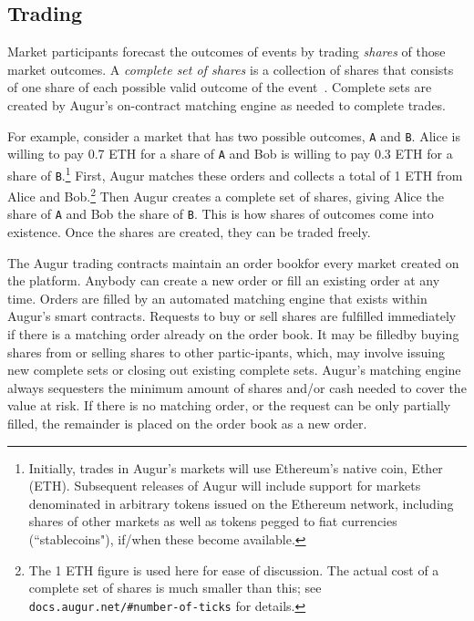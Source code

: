 \documentclass[12pt,floatfix,reprint,nofootinbib,amsmath,amssymb,epsfig,pre,floats,letterpaper,groupedaffiliation]{revtex4-1}
\theoremstyle{definition}
\theoremstyle{definition}
\begin{document}
\subsection{Trading}

Market participants forecast the outcomes of events by trading \textit{shares} of those market outcomes. A \textit{complete set of shares} is a collection of shares that consists of one share of each possible valid outcome of the event~\cite{Clark_2014}. Complete sets are created by Augur's on-contract matching engine as needed to complete trades.

For example, consider a market that has two possible outcomes, \texttt{A} and \texttt{B}. Alice is willing to pay 0.7 ETH for a share of \texttt{A} and Bob is willing to pay 0.3 ETH for a share of \texttt{B}.\footnote{Initially, trades in Augur's markets will use Ethereum's native coin, Ether (ETH). Subsequent releases of Augur will include support for markets denominated in arbitrary tokens issued on the Ethereum network, including shares of other markets as well as tokens pegged to fiat currencies (``stablecoins"), if/when these become available.} First, Augur matches these orders and collects a total of 1 ETH from Alice and Bob.\footnote{\label{footnote:complete_set_cost}The 1 ETH figure is used here for ease of discussion. The actual cost of a complete set of shares is much smaller than this; see \texttt{docs.augur.net/\#number-of-ticks} for details.} Then Augur creates a complete set of shares, giving Alice the share of \texttt{A} and Bob the share of \texttt{B}. This is how shares of outcomes come into existence. Once the shares are created, they can be traded freely.

The Augur trading contracts maintain an order book\linebreak for every market created on the platform. Anybody can create a new order or fill an existing order at any time. Orders are filled by an automated matching engine that exists within Augur's smart contracts. Requests to buy or sell shares are fulfilled immediately if there is a matching order already on the order book. It may be filled\linebreak by buying shares from or selling shares to other partic-\linebreak ipants, which, may involve issuing new complete sets or closing out existing complete sets. Augur's matching engine always sequesters the minimum amount of shares and/or cash needed to cover the value at risk. If there is no matching order, or the request can be only partially filled, the remainder is placed on the order book as a new order.
\end{document}
